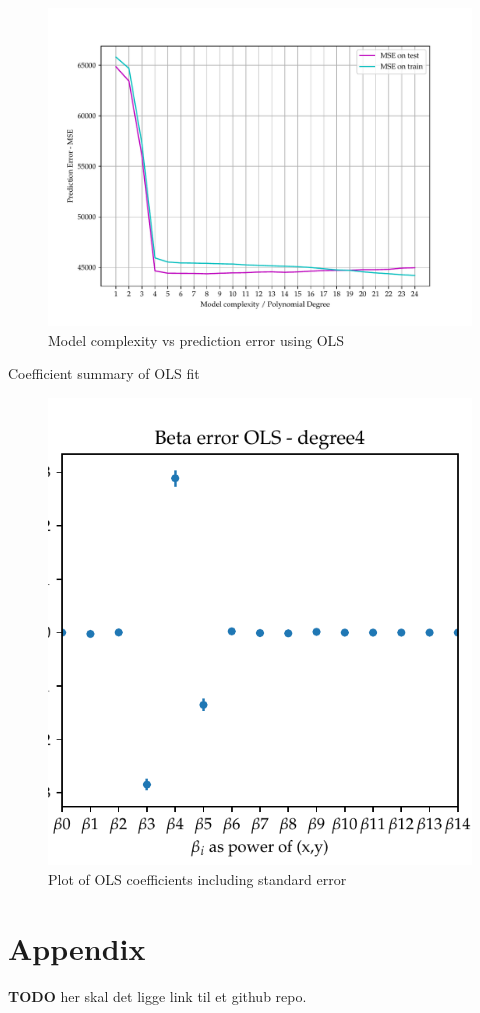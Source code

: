\documentclass[11pt, a4paper]{article}
\begin{document}
\begin{figure}
  \centering
  \includegraphics[scale=0.75]{figures/EX6_EX1_terrain_patch_OLS_evaluate_fit.pdf}
  \caption{Model complexity vs prediction error using OLS}
  \label{fig:EX6_1_OLS_fit}
\end{figure}

\begin{table}
  \centering
  \caption{Coefficient summary of OLS fit}
  \label{data:EX6_1_OLS_betas}
\end{table}

\begin{figure}
  \centering
  \includegraphics[scale=0.9]{figures/EX6_EX1_OLS_beta_error_degree4.pdf}
  \caption{Plot of OLS coefficients including standard error}
  \label{fig:EX6_1_OLS_betas_plot}
\end{figure}


\section*{Appendix\label{sec:A}}
\textbf{TODO} her skal det ligge link til et github repo. 

\newpage
\newpage



\end{document}

